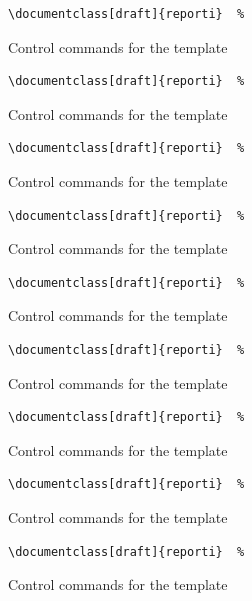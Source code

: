 \documentclass[english]{reporti}
\begin{document}
\begin{listing}[H]
\begin{verbatim}
\documentclass[draft]{reporti}  %
\end{verbatim}
\caption{Control commands for the template}
\end{listing}

\begin{listing}[H]
\begin{verbatim}
\documentclass[draft]{reporti}  %
\end{verbatim}
\caption{Control commands for the template}
\end{listing}
\begin{listing}[H]
\begin{verbatim}
\documentclass[draft]{reporti}  %
\end{verbatim}
\caption{Control commands for the template}
\end{listing}

\begin{listing}[H]
\begin{verbatim}
\documentclass[draft]{reporti}  %
\end{verbatim}
\caption{Control commands for the template}
\end{listing}

\begin{listing}[H]
\begin{verbatim}
\documentclass[draft]{reporti}  %
\end{verbatim}
\caption{Control commands for the template}
\end{listing}
\begin{listing}[H]
\begin{verbatim}
\documentclass[draft]{reporti}  %
\end{verbatim}
\caption{Control commands for the template}
\end{listing}

\begin{listing}[H]
\begin{verbatim}
\documentclass[draft]{reporti}  %
\end{verbatim}
\caption{Control commands for the template}
\end{listing}

\begin{listing}[H]
\begin{verbatim}
\documentclass[draft]{reporti}  %
\end{verbatim}
\caption{Control commands for the template}
\end{listing}
\begin{listing}[H]
\begin{verbatim}
\documentclass[draft]{reporti}  %
\end{verbatim}
\caption{Control commands for the template}
\end{listing}
\end{document}
